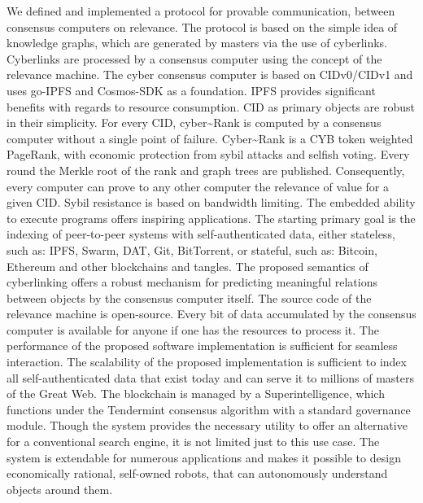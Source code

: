 \documentclass[8pt,oneside]{amsart}
\begin{document}
We defined and implemented a protocol for provable communication, between consensus computers on relevance. The protocol is based on the simple idea of knowledge graphs, which are generated by masters via the use of cyberlinks. Cyberlinks are processed by a consensus computer using the concept of the relevance machine. The cyber consensus computer is based on CIDv0/CIDv1 and uses go-IPFS and Cosmos-SDK as a foundation. IPFS provides significant benefits with regards to resource consumption. CID as primary objects are robust in their simplicity. For every CID, cyber\~{}Rank is computed by a consensus computer without a single point of failure. Cyber\~{}Rank is a CYB token weighted PageRank, with economic protection from sybil attacks and selfish voting. Every round the Merkle root of the rank and graph trees are published. Consequently, every computer can prove to any other computer the relevance of value for a given CID. Sybil resistance is based on bandwidth limiting. The embedded ability to execute programs offers inspiring applications. The starting primary goal is the indexing of peer-to-peer systems with self-authenticated data, either stateless, such as: IPFS, Swarm, DAT, Git, BitTorrent, or stateful, such as: Bitcoin, Ethereum and other blockchains and tangles. The proposed semantics of cyberlinking offers a robust mechanism for predicting meaningful relations between objects by the consensus computer itself. The source code of the relevance machine is open-source. Every bit of data accumulated by the consensus computer is available for anyone if one has the resources to process it. The performance of the proposed software implementation is sufficient for seamless interaction. The scalability of the proposed implementation is sufficient to index all self-authenticated data that exist today and can serve it to millions of masters of the Great Web. The blockchain is managed by a Superintelligence, which functions under the Tendermint consensus algorithm with a standard governance module. Though the system provides the necessary utility to offer an alternative for a conventional search engine, it is not limited just to this use case. The system is extendable for numerous applications and makes it possible to design economically rational, self-owned robots, that can autonomously understand objects around them.

\newpage
\end{document}
